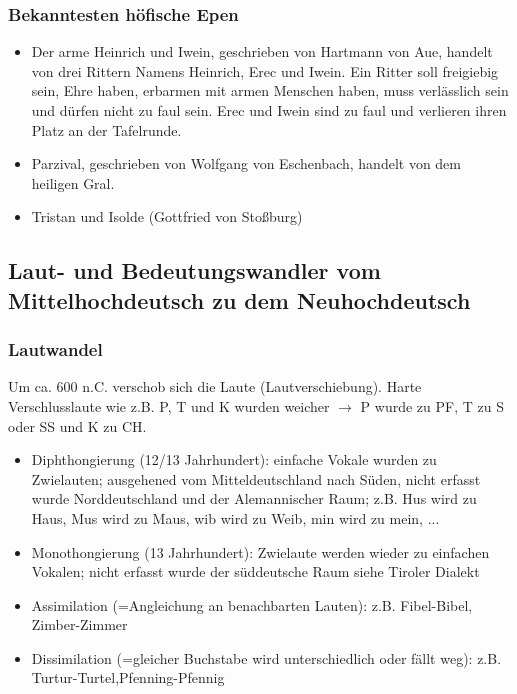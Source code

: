 \documentclass[12pt,a4paper]{article}
\begin{document}
\subsubsection{Bekanntesten höfische Epen}
		
\begin{itemize}
\item Der arme Heinrich und Iwein, geschrieben von Hartmann von Aue, handelt von drei Rittern Namens Heinrich, Erec und Iwein. Ein Ritter soll freigiebig sein, Ehre haben, erbarmen mit armen Menschen haben, muss verlässlich sein und dürfen nicht zu faul sein. Erec und Iwein sind zu faul und verlieren ihren Platz an der Tafelrunde.
\item Parzival, geschrieben von Wolfgang von Eschenbach, handelt von dem heiligen Gral.		\item Tristan und Isolde (Gottfried von Stoßburg)
\end{itemize}				
	
\subsection{Laut- und Bedeutungswandler vom Mittelhochdeutsch zu dem Neuhochdeutsch}

\subsubsection{Lautwandel}
Um ca. 600 n.C. verschob sich die Laute (Lautverschiebung). Harte Verschlusslaute wie z.B. P, T und K wurden weicher $\rightarrow$ P wurde zu PF, T zu S oder SS und K zu CH.

\begin{itemize}
\item Diphthongierung (12/13 Jahrhundert): einfache Vokale wurden zu Zwielauten; ausgehened vom Mitteldeutschland nach
Süden, nicht erfasst wurde Norddeutschland und der Alemannischer Raum; z.B. Hus wird zu Haus, Mus wird zu Maus, wib wird
zu Weib, min wird zu mein, ...

\item Monothongierung (13 Jahrhundert): Zwielaute werden wieder zu einfachen Vokalen; nicht erfasst wurde der süddeutsche Raum siehe Tiroler Dialekt
\end{itemize}

\begin{itemize}
\item Assimilation (=Angleichung an benachbarten Lauten): z.B. Fibel-Bibel, Zimber-Zimmer
\item Dissimilation (=gleicher Buchstabe wird unterschiedlich oder fällt weg): z.B. Turtur-Turtel,Pfenning-Pfennig
\end{itemize}
	
\end{document}
